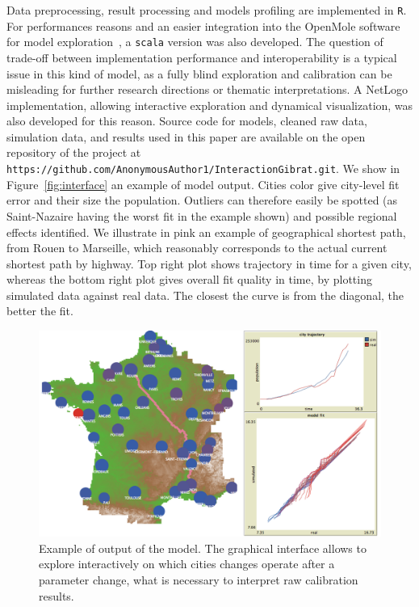Data preprocessing, result processing and models profiling are implemented in \texttt{R}. For performances reasons and an easier integration into the OpenMole software for model exploration~\citep{reuillon2013openmole}, a \texttt{scala} version was also developed. The question of trade-off between implementation performance and interoperability is a typical issue in this kind of model, as a fully blind exploration and calibration can be misleading for further research directions or thematic interpretations. A NetLogo implementation, allowing interactive exploration and dynamical visualization, was also developed for this reason. Source code for models, cleaned raw data, simulation data, and results used in this paper are available on the open repository of the project at \texttt{https://github.com/AnonymousAuthor1/InteractionGibrat.git}. We show in Figure~\ref{fig:interface} an example of model output. Cities color give city-level fit error and their size the population. Outliers can therefore easily be spotted (as Saint-Nazaire having the worst fit in the example shown) and possible regional effects identified. We illustrate in pink an example of geographical shortest path, from Rouen to Marseille, which reasonably corresponds to the actual current shortest path by highway. Top right plot shows trajectory in time for a given city, whereas the bottom right plot gives overall fit quality in time, by plotting simulated data against real data. The closest the curve is from the diagonal, the better the fit.


\begin{figure}
\centering
\includegraphics[width=\textwidth]{Figures/InteractionGibrat/Fig2}
\caption{Example of output of the model. The graphical interface allows to explore interactively on which cities changes operate after a parameter change, what is necessary to interpret raw calibration results.}
\label{fig:interactiongibrat:interface}
\end{figure}


